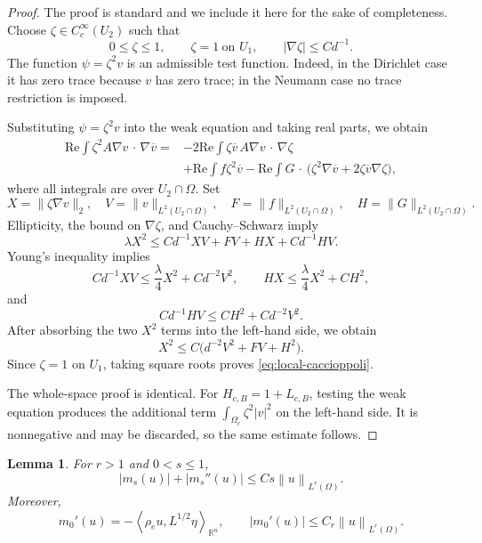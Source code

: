 \documentclass[12pt]{amsart}
\newcommand\R{\mathbb{R}}
\newcommand{\cdo}{\, \cdot \,}
\newcommand{\ip}[2]{\left\langle #1,#2\right\rangle}
\newcommand{\norm}[2]{\left\lVert #1\right\rVert_{#2}}
\newcommand{\abs}[1]{\left\lvert #1\right\rvert}
\newtheorem{lemma}[theorem]{Lemma}
\theoremstyle{remark}
\begin{document}
\begin{proof}
The proof is standard and we include it here for the sake of completeness. Choose $\zeta\in C_c^\infty(U_2)$ such that
\[
 0\leq\zeta\leq1,
 \qquad \zeta=1\ \text{on }U_1,
 \qquad |\nabla\zeta|\leq C d^{-1}.
\]
The function $\psi=\zeta^2v$ is an admissible test function.  Indeed, in
the Dirichlet case it has zero trace because $v$ has zero trace; in the Neumann case no trace restriction is
imposed.

Substituting $\psi=\zeta^2v$ into the weak equation and taking real parts,
we obtain
\begin{align*}
 \textrm{Re}\int \zeta^2A\nabla v\mathbin{\cdo}\nabla\overline v
 ={}&-2\textrm{Re}\int
   \zeta\overline v\,A\nabla v\mathbin{\cdo}\nabla\zeta\\
 &+\textrm{Re}\int f\zeta^2\overline v
 -\textrm{Re}\int G\mathbin{\cdo}
 \bigl(\zeta^2\nabla\overline v
       +2\zeta\overline v\nabla\zeta\bigr),
\end{align*}
where all integrals are over $U_2\cap\Omega$.  Set
\[
 X=\|\zeta\nabla v\|_2,\quad
 V=\|v\|_{L^2(U_2\cap\Omega)},\quad
 F=\|f\|_{L^2(U_2\cap\Omega)},\quad
 H=\|G\|_{L^2(U_2\cap\Omega)}.
\]
Ellipticity, the bound on $\nabla\zeta$, and Cauchy--Schwarz imply
\[
 \lambda X^2\leq C d^{-1}XV+FV+HX+C d^{-1}HV.
\]
Young's inequality implies
\[
 C d^{-1}XV\leq\frac{\lambda}{4}X^2+C d^{-2}V^2,
 \qquad
 HX\leq\frac{\lambda}{4}X^2+CH^2,
\]
and
\[
 C d^{-1}HV\leq CH^2+C d^{-2}V^2.
\]
After absorbing the two $X^2$ terms into the left-hand side, we obtain
\[
 X^2\leq C\bigl(d^{-2}V^2+FV+H^2\bigr).
\]
Since $\zeta=1$ on $U_1$, taking square roots proves
\eqref{eq:local-caccioppoli}.

The whole-space proof is identical.  For $H_{c,B}=1+L_{c,B}$, testing
the weak equation produces the additional term
$\int_{\Omega_c}\zeta^2|v|^2$ on the left-hand side.  It is nonnegative
and may be discarded, so the same estimate follows.
\end{proof}

\begin{lemma}\label{lem:m-small}
For $r>1$ and $0<s\leq1$,
\begin{equation}\label{eq:m-small}
 \abs{m_s(u)}+\abs{m_s''(u)}
 \leq Cs\norm u{L^r(\Omega)}.
\end{equation}
Moreover,
\begin{equation}\label{eq:m-prime-zero}
 m_0'(u)=-\ip{\rho_eu}{L^{1/2}\eta}_{\R^n},
 \qquad \abs{m_0'(u)}\leq C_r\norm u{L^r(\Omega)}.
\end{equation}
\end{lemma}
\end{document}
